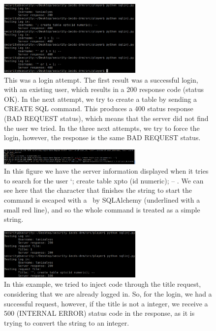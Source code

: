 \documentclass[11pt,a4paper]{report}
\begin{document}
\begin{figure}[H]
\centerline{\includegraphics[width=200pt]{images/loginTest.png}}
\caption{This was a login attempt. The first result was a successful login, with an existing user, which results in a 200 response code (status OK). In the next attempt, we try to create a table by sending a CREATE SQL command. This produces a 400 status response (BAD REQUEST status), which means that the server did not find the user we tried. In the three next attempts, we try to force the login, however, the response is the same BAD REQUEST status.}
\label{player}
\end{figure}

\begin{figure}[H]
\centerline{\includegraphics[width=200pt]{images/escapedChar.png}}
\caption{In this figure we have the server information displayed when it tries to search for the user ‘; create table xpto (id numeric); -- . We can see here that the character that finishes the string to start the command is escaped with a \ by SQLAlchemy (underlined with a small red line), and so the whole command is treated as a simple string.}
\label{player}
\end{figure}

\begin{figure}[H]
\centerline{\includegraphics[width=200pt]{images/requestTitleTest.png}}
\caption{In this example, we tried to inject code through the title request, considering that we are already logged in. So, for the login, we had a successful request, however, if the title is not a integer, we receive a 500 (INTERNAL ERROR) status code in the response, as it is trying to convert the string to an integer.}
\label{player}
\end{figure}
\end{document}
